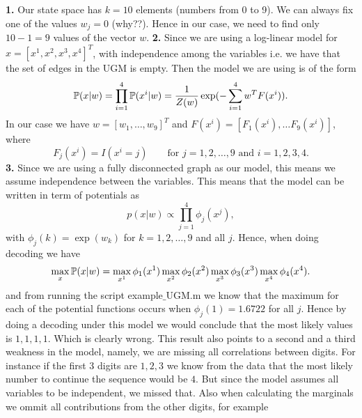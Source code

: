 \documentclass{article}
\begin{document}
\textbf{1.}
\newline
Our state space has $k=10$ elements (numbers from 0 to 9). We can always fix one of the values $w_{j}=0$ (why??).
Hence in our case, we need to find only $10-1=9$  
values of the vector $w$.
\newline
\newline
\textbf{2.}
\newline
Since we are using a log-linear model for $x=[x^{1},x^{2},x^{3},x^{4}]^{T}$, with independence among the variables
i.e. we have that the set of edges in the UGM is empty. Then the model we are using is of the form
\begin{equation*}
\mathbb{P}(x|w)=\prod_{i=1}^{4}\mathbb{P}(x^{i}|w)=\frac{1}{Z(w)}\exp(-\sum_{i=1}^{4}w^{T}F(x^{i})).
\end{equation*}
In our case we have $w=[w_{1},\ldots, w_{9}]^{T}$ and $F(x^{i})=[F_{1}(x^{i}),\ldots F_{9}(x^{i})]$, where
\begin{equation*}
F_{j}(x^{i})=I(x^{i}=j)\qquad\text{for }j=1,2,\ldots,9\text{ and } i=1,2,3,4.
\end{equation*}
\newline
\textbf{3.}
\newline
\newline
Since we are using a fully disconnected graph as our model, this means we assume independence between the variables. This
means that the model can be written in term of potentials as
\begin{equation*}
p(x|w)\propto \prod_{j=1}^{4}\phi_{j}(x^{j}),
\end{equation*}
with $\phi_{j}(k)=\exp(w_{k})$ for $k=1,2,\ldots,9$ and all $j$. Hence, when doing decoding we have
\begin{equation*}
\max_{x}\mathbb{P}(x|w)=\max_{x^{1}}\phi_{1}(x^{1})\max_{x^{2}}\phi_{2}(x^{2})\max_{x^{3}}\phi_{3}(x^{3})\max_{x^{4}}\phi_{4}(x^{4}).
\end{equation*}
and from running the script example$\_$UGM.m we know that the maximum for each of the potential functions
occurs when $\phi_{j}(1)=1.6722$ for all $j$. Hence by doing a decoding under this model we would 
conclude that the most likely values is $1,1,1,1$. Which is clearly wrong. This result also points
to a second and a third weakness in the model, namely, 
we are missing all correlations between digits. For instance
if the first 3 digits are $1,2,3$ we know from the data that the most likely number to continue the 
sequence would be $4$. But since the model assumes all variables to be independent, we missed that.
Also when calculating the marginals we ommit all contributions from the other digits, for example
\end{document}
